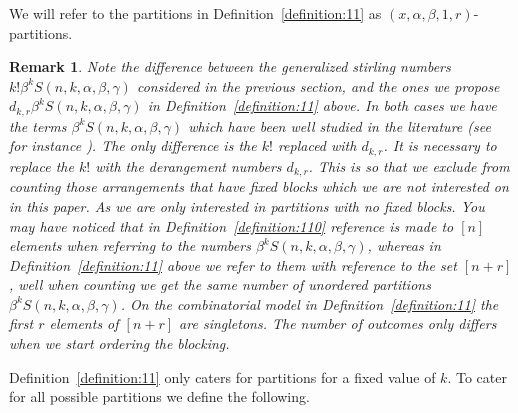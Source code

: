 \documentclass[12pt]{amsart}
\newtheorem{proof 1}{proof 1}
\newtheorem{remark}{Remark}[section]
\begin{document}
We will refer to the partitions in Definition~\ref{definition:11} as  $(x,\alpha,\beta,1,r)$-partitions.

\begin{remark}\label{remark:3}Note the difference between the generalized stirling numbers \\ $k!\beta^kS(n,k,\alpha,\beta,\gamma)$ considered in the previous section, and the ones we propose \\$d_{k,r}\beta^{k} S(n,k,\alpha,\beta,\gamma)$	in Definition~\ref{definition:11} above. In both cases we have the terms $\beta^kS(n,k,\alpha,\beta,\gamma)$ which have been well studied in the literature (see for instance \cite{benyi2024combinatorial,kargin2018higher,nkonkobe2020combinatorial}). The only difference is the $k!$ replaced with $d_{k,r}$. It is necessary to replace the $k!$ with the derangement numbers $d_{k,r}$. This is so that we exclude from counting those arrangements that have fixed blocks which we are not interested on in this paper. As we are only interested in partitions with no fixed blocks. You may have noticed that in Definition~\ref{definition:110} reference is made to $[n]$ elements when referring to the numbers $\beta^k S(n,k,\alpha,\beta,\gamma)$, whereas in Definition~\ref{definition:11} above we refer to them with reference to the set $[n+r]$, well when counting we get the same number of unordered partitions $\beta^kS(n,k,\alpha,\beta,\gamma)$. On the combinatorial model in Definition~\ref{definition:11} the first $r$ elements of $[n+r]$ are singletons. The number of outcomes only differs when we start ordering the blocking. 
	
\end{remark}
Definition~\ref{definition:11} only caters for partitions for a fixed value of $k$. To cater for all possible partitions we define the following.
\end{document}
